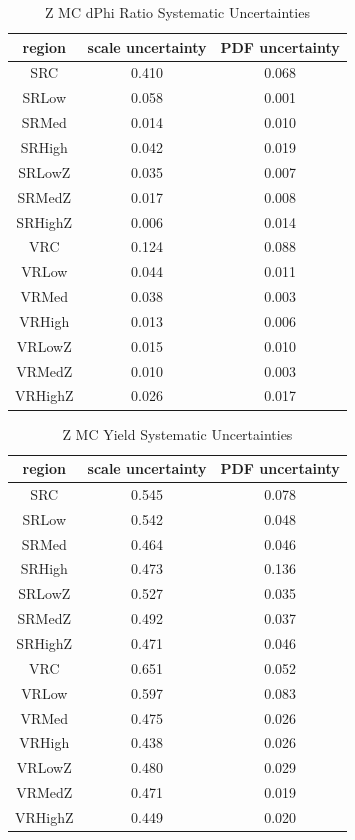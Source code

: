 \begin{table}
\caption{Z MC dPhi Ratio Systematic Uncertainties}
\begin{center}
\begin{tabular}{c|c|c}
region & scale uncertainty & PDF uncertainty \\
\hline
SRC & 0.410 & 0.068 \\
SRLow & 0.058 & 0.001 \\
SRMed & 0.014 & 0.010 \\
SRHigh & 0.042 & 0.019 \\
SRLowZ & 0.035 & 0.007 \\
SRMedZ & 0.017 & 0.008 \\
SRHighZ & 0.006 & 0.014 \\
VRC & 0.124 & 0.088 \\
VRLow & 0.044 & 0.011 \\
VRMed & 0.038 & 0.003 \\
VRHigh & 0.013 & 0.006 \\
VRLowZ & 0.015 & 0.010 \\
VRMedZ & 0.010 & 0.003 \\
VRHighZ & 0.026 & 0.017 \\
\end{tabular}
\end{center}
\label{tab:ZMC_ratio_systematics_rep} 
\end{table}

\begin{table}
\caption{Z MC Yield Systematic Uncertainties}
\begin{center}
\begin{tabular}{c|c|c}
region & scale uncertainty & PDF uncertainty \\
\hline
SRC & 0.545 & 0.078 \\
SRLow & 0.542 & 0.048 \\
SRMed & 0.464 & 0.046 \\
SRHigh & 0.473 & 0.136 \\
SRLowZ & 0.527 & 0.035 \\
SRMedZ & 0.492 & 0.037 \\
SRHighZ & 0.471 & 0.046 \\
VRC & 0.651 & 0.052 \\
VRLow & 0.597 & 0.083 \\
VRMed & 0.475 & 0.026 \\
VRHigh & 0.438 & 0.026 \\
VRLowZ & 0.480 & 0.029 \\
VRMedZ & 0.471 & 0.019 \\
VRHighZ & 0.449 & 0.020 \\
\end{tabular}
\end{center}
\label{tab:ZMC_yield_systematics} 
\end{table}

